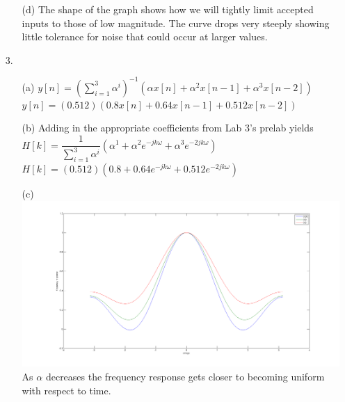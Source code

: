 \documentclass{article}
\begin{document}
\begin{enumerate}
\begin{enumerate}
\bigskip

	\item [(d)]
		 The shape of the graph shows how we will tightly limit accepted inputs to those of low magnitude. The curve drops very steeply showing little tolerance for noise that could occur at larger values. 
	\end{enumerate}

\newpage

\item[3.]
	\begin{enumerate}
	\item[(a)]
		$y\left[n\right] = \left(\displaystyle\sum_{i=1}^{3} \alpha^i\right)^{-1} \left(\alpha x[n] + \alpha^2 x[n-1] + \alpha^3 x[n-2]\right)$\\
		
		$y\left[n\right] = \left(0.512\right) \left(0.8 x[n] + 0.64 x[n-1] + 0.512 x[n-2]\right)$

\bigskip

	\item[(b)]
		Adding in the appropriate coefficients from Lab 3's prelab yields\\
		
		$H\left[k\right] = \dfrac{1}{\sum_{i=1}^{3} \alpha^i} \left(\alpha^1 + \alpha^2 e^{-jk\omega} + \alpha^3 e^{-2jk\omega}\right)$\\
		
		$H\left[k\right] = \left(0.512\right) \left(0.8 + 0.64 e^{-jk\omega} + 0.512 e^{-2jk\omega}\right)$

\bigskip

	\item[(c)] $\:$ \\
		\includegraphics[scale=0.3]{../images/FrequencyResponse.png}
		As $\alpha$ decreases the frequency response gets closer to becoming uniform with respect to time.


\end{enumerate}
\end{enumerate}
\end{document}
